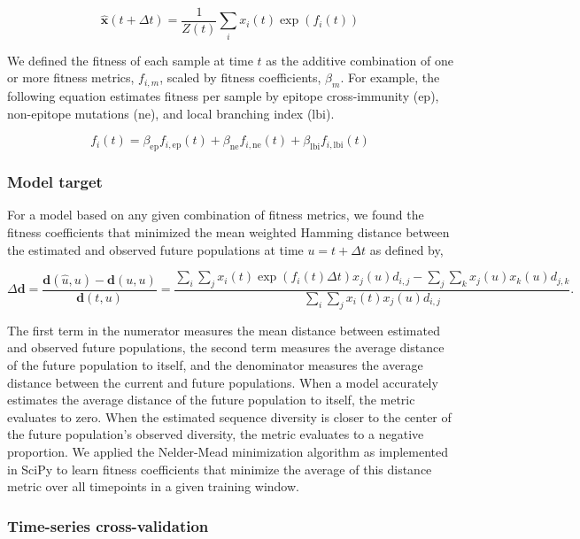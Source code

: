 $$
\mathbf{\hat{x}}(t + \Delta{t}) = \frac{1}{Z(t)}\sum_{i}x_{i}(t)\exp(f_{i}(t))
$$

We defined the fitness of each sample at time $t$ as the additive combination of one or more fitness metrics, $f_{i,m}$, scaled by fitness coefficients, $\beta_{m}$.
For example, the following equation estimates fitness per sample by epitope cross-immunity ($\mathrm{ep}$), non-epitope mutations ($\mathrm{ne}$), and local branching index ($\mathrm{lbi}$).

$$
f_{i}(t) = \beta_{\mathrm{ep}}f_{i, \mathrm{ep}}(t) + \beta_{\mathrm{ne}}f_{i, \mathrm{ne}}(t) + \beta_{\mathrm{lbi}}f_{i, \mathrm{lbi}}(t)
$$

\subsubsection*{Model target}

For a model based on any given combination of fitness metrics, we found the fitness coefficients that minimized the mean weighted Hamming distance between the estimated and observed future populations at time $u = t + \Delta{t}$ as defined by,

$$
\Delta\mathbf{d} = \frac{\mathbf{d}(\hat{u}, u) - \mathbf{d}(u, u)}{\mathbf{d}(t, u)}
                                           = \frac{\sum_{i}\sum_{j}x_{i}(t)\exp(f_{i}(t)\Delta{t})x_{j}(u)d_{i,j} - \sum_{j}\sum_{k}x_{j}(u)x_{k}(u)d_{j,k}}{\sum_{i}\sum_{j}x_{i}(t)x_{j}(u)d_{i,j}}.
$$

The first term in the numerator measures the mean distance between estimated and observed future populations, the second term measures the average distance of the future population to itself, and the denominator measures the average distance between the current and future populations.
When a model accurately estimates the average distance of the future population to itself, the metric evaluates to zero.
When the estimated sequence diversity is closer to the center of the future population's observed diversity, the metric evaluates to a negative proportion.
We applied the Nelder-Mead minimization algorithm as implemented in SciPy \cite{SciPy} to learn fitness coefficients that minimize the average of this distance metric over all timepoints in a given training window.

\subsubsection*{Time-series cross-validation}

